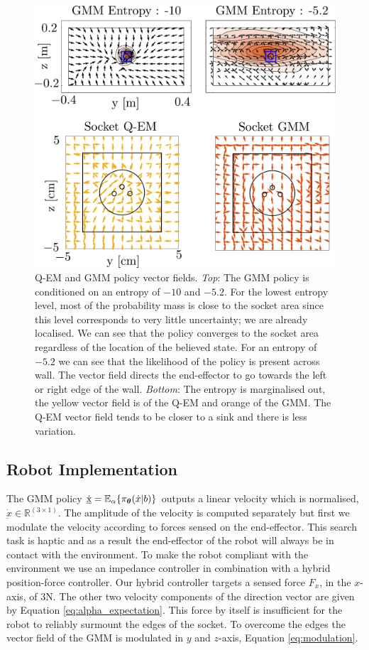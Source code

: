\begin{figure}
   \includegraphics[width=\textwidth]{./ch4-PiH/Figures/Fig/policy_vf.pdf}
  \caption{Q-EM and GMM policy vector fields. \textit{Top}: The GMM policy is conditioned on an entropy of $-10$ and $-5.2$. For the lowest entropy level,
  most of the probability mass is close to the socket area since this level corresponds to very little uncertainty; we are already localised. We can see 
  that the policy converges to the socket area regardless of the location of the believed state. For an entropy of $-5.2$ we can see that 
  the likelihood of the policy is present across wall. The vector field directs the end-effector to go towards the left or right edge of the wall. 
  \textit{Bottom}: The entropy is marginalised out, the yellow vector field is of the Q-EM and orange of the GMM. The Q-EM vector field tends 
  to be closer to a sink and there is less variation.}
  \label{fig:policy_vf}
\end{figure}


\subsection{Robot Implementation}

The GMM policy $\dot{\underbar{x}} = \mathbb{E}_{\alpha}\{\pi_{\boldsymbol{\theta}}(\dot{x}|b)\}$ outputs a linear velocity which is normalised, $\dot{\underbar{x}} \in \mathbb{R}^{(3 \times 1)}$. 
The amplitude of the velocity is computed separately but first we modulate the velocity according to forces sensed on 
the end-effector.
This search task is haptic and as a result the end-effector of the robot will always be in contact with the environment. To make the robot
compliant with the environment we use an impedance controller in combination with a hybrid position-force controller. Our hybrid controller
targets a sensed force $F_x$, in the $x$-axis, of 3N. The other two velocity components of the direction vector are given by 
Equation \ref{eq:alpha_expectation}. This force by itself is insufficient for the robot to reliably surmount the edges of the socket.
To overcome the edges the vector field of the GMM is modulated in $y$ and $z$-axis, Equation \ref{eq:modulation}.

